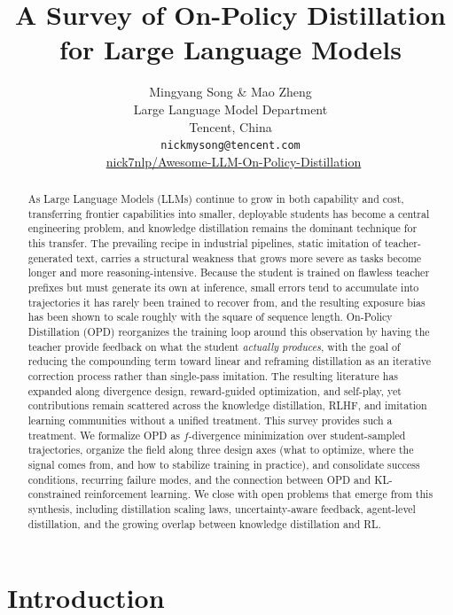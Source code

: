 \documentclass{article} %
\title{A Survey of On-Policy Distillation for Large Language Models}
\author{Mingyang Song \& Mao Zheng \\
Large Language Model Department \\Tencent, China\\
\texttt{nickmysong@tencent.com}\\[2pt]
\faGithub\ \href{https://github.com/nick7nlp/Awesome-LLM-On-Policy-Distillation}{nick7nlp/Awesome-LLM-On-Policy-Distillation}}
\begin{document}
\maketitle

\begin{abstract}
As Large Language Models (LLMs) continue to grow in both capability and cost, transferring frontier capabilities into smaller, deployable students has become a central engineering problem, and knowledge distillation remains the dominant technique for this transfer. The prevailing recipe in industrial pipelines, static imitation of teacher-generated text, carries a structural weakness that grows more severe as tasks become longer and more reasoning-intensive. Because the student is trained on flawless teacher prefixes but must generate its own at inference, small errors tend to accumulate into trajectories it has rarely been trained to recover from, and the resulting exposure bias has been shown to scale roughly with the square of sequence length. On-Policy Distillation (OPD) reorganizes the training loop around this observation by having the teacher provide feedback on what the student \emph{actually produces}, with the goal of reducing the compounding term toward linear and reframing distillation as an iterative correction process rather than single-pass imitation. The resulting literature has expanded along divergence design, reward-guided optimization, and self-play, yet contributions remain scattered across the knowledge distillation, RLHF, and imitation learning communities without a unified treatment. This survey provides such a treatment. We formalize OPD as $f$-divergence minimization over student-sampled trajectories, organize the field along three design axes (what to optimize, where the signal comes from, and how to stabilize training in practice), and consolidate success conditions, recurring failure modes, and the connection between OPD and KL-constrained reinforcement learning. We close with open problems that emerge from this synthesis, including distillation scaling laws, uncertainty-aware feedback, agent-level distillation, and the growing overlap between knowledge distillation and RL.
\end{abstract}

\section{Introduction}
\label{sec:intro}
\end{document}
